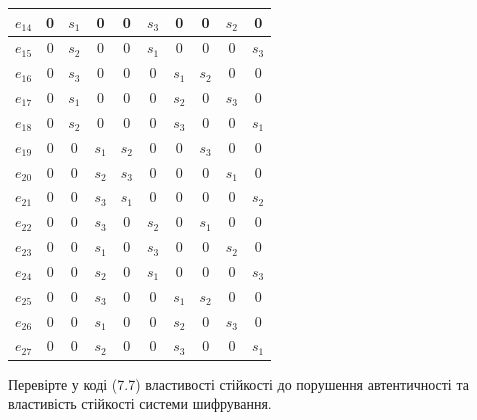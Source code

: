 \begin{example}
\begin{center}
\begin{tabular}{|c|c|c|c|c|c|c|c|c|c|}
            $e_{14}$ & 0 & $s_1$ & 0 & 0 & $s_3$ & 0 & 0 & $s_2$ & 0 \\\hline
            $e_{15}$ & 0 & $s_2$ & 0 & 0 & $s_1$ & 0 & 0 & 0 & $s_3$ \\\hline
            $e_{16}$ & 0 & $s_3$ & 0 & 0 & 0 & $s_1$ & $s_2$ & 0 & 0 \\\hline
            $e_{17}$ & 0 & $s_1$ & 0 & 0 & 0 & $s_2$ & 0 & $s_3$ &0 \\\hline
            $e_{18}$ & 0 & $s_2$ & 0 & 0 & 0 & $s_3$ & 0 & 0 & $s_1$ \\\hline
            $e_{19}$ & 0 & 0 & $s_1$ & $s_2$ & 0 & 0 & $s_3$ & 0 & 0 \\\hline
            $e_{20}$ & 0 & 0 & $s_2$ & $s_3$ & 0 & 0 & 0 & $s_1$ & 0 \\\hline
            $e_{21}$ & 0 & 0 & $s_3$ & $s_1$ & 0 & 0 & 0 & 0 & $s_2$ \\\hline
            $e_{22}$ & 0 & 0 & $s_3$ & 0 & $s_2$ & 0 & $s_1$ &0 & 0 \\\hline
            $e_{23}$ & 0 & 0 & $s_1$ & 0 & $s_3$ & 0 & 0 & $s_2$ & 0 \\\hline
            $e_{24}$ & 0 & 0 & $s_2$ & 0 & $s_1$ & 0 & 0 & 0 & $s_3$ \\\hline
            $e_{25}$ & 0 & 0 & $s_3$ & 0 & 0 & $s_1$ & $s_2$ & 0 & 0 \\\hline
            $e_{26}$ & 0 & 0 & $s_1$ & 0 & 0 & $s_2$ & 0 & $s_3$ & 0 \\\hline
            $e_{27}$ & 0 & 0 & $s_2$ & 0 & 0 & $s_3$ & 0 & 0 & $s_1$ \\\hline
        \end{tabular}
    \end{center}
    
    Перевірте у коді (7.7) властивості стійкості до порушення автентичності та
    властивість стійкості системи шифрування.
    

\end{example}
